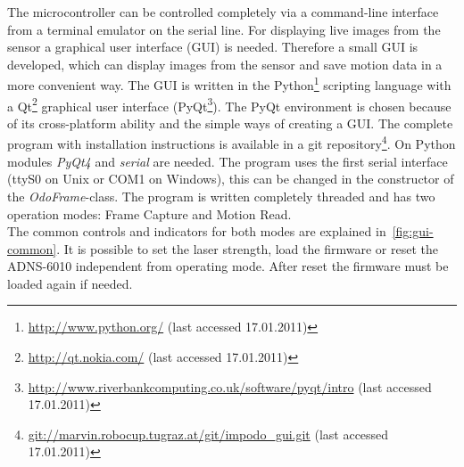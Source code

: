\documentclass[12pt,a4paper]{article}
\begin{document}
The microcontroller can be controlled completely via a command-line interface from a terminal emulator on the serial line.
For displaying live images from the sensor a graphical user interface (GUI) is needed.
Therefore a small GUI is developed, which can display images from the sensor and save motion data in a more convenient way.
The GUI is written in the Python\footnote{\url{http://www.python.org/} (last accessed 17.01.2011)} scripting language with a Qt\footnote{\url{http://qt.nokia.com/}  (last accessed 17.01.2011)} graphical user interface (PyQt\footnote{\url{http://www.riverbankcomputing.co.uk/software/pyqt/intro} (last accessed 17.01.2011)}).
The PyQt environment is chosen because of its cross-platform ability and the simple ways of creating a GUI.
The complete program with installation instructions is available in a git repository\footnote{\url{git://marvin.robocup.tugraz.at/git/impodo_gui.git} (last accessed 17.01.2011)}.
On Python modules \emph{PyQt4} and \emph{serial} are needed.
The program uses the first serial interface (ttyS0 on Unix or COM1 on Windows), this can be changed in the constructor of the \emph{OdoFrame}-class.
The program is written completely threaded and has two operation modes: Frame Capture and Motion Read.\\
The common controls and indicators for both modes are explained in~\autoref{fig:gui-common}.
It is possible to set the laser strength, load the firmware or reset the ADNS-6010 independent from operating mode.
After reset the firmware must be loaded again if needed.
\end{document}
